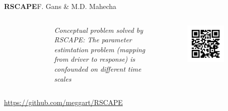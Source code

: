 \begin{columns}
\begin{column}{.48\textwidth}
\begin{center}
\begin{minipage}[T]{.95\textwidth}
{\begin{block}{\textbf{RSCAPE}\hfill\normalsize{F. Gans \& M.D. Mahecha}}
\begin{columns}
\begin{figure}[tb]
	\end{figure}
\small{\textit{Conceptual problem solved by RSCAPE: The parameter estimtation problem (mapping from driver to response) is confounded on different time scales}}
\vspace{4cm}
	\begin{figure}[tb]
		\includegraphics[width=.6\textwidth]{images/qrcode-RSCAPE.jpg}
	\end{figure}
\end{columns}
\vspace{1cm}
\hfill\large{\url{https://github.com/meggart/RSCAPE}}
\end{block}


\vfill

}

         
			          
\end{minipage}
\end{center}
\end{column}    











\begin{column}{.48\textwidth}
\begin{minipage}[T]{.95\textwidth}
\parbox[t][\columnheight]{\textwidth}{}
\end{minipage}
\end{column}   
\end{columns}
